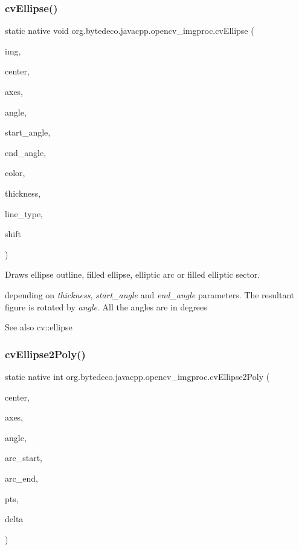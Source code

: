 \subsubsection{\texorpdfstring{cv\+Ellipse()}{cvEllipse()}}
{\footnotesize\ttfamily static native void org.\+bytedeco.\+javacpp.\+opencv\+\_\+imgproc.\+cv\+Ellipse (\begin{DoxyParamCaption}\item[{Cv\+Arr}]{img,  }\item[{@By\+Val Cv\+Point}]{center,  }\item[{@By\+Val Cv\+Size}]{axes,  }\item[{double}]{angle,  }\item[{double}]{start\+\_\+angle,  }\item[{double}]{end\+\_\+angle,  }\item[{@By\+Val Cv\+Scalar}]{color,  }\item[{int}]{thickness,  }\item[{int}]{line\+\_\+type,  }\item[{int}]{shift }\end{DoxyParamCaption})\hspace{0.3cm}{\ttfamily [static]}}



Draws ellipse outline, filled ellipse, elliptic arc or filled elliptic sector. 

depending on {\itshape thickness}, {\itshape start\+\_\+angle} and {\itshape end\+\_\+angle} parameters. The resultant figure is rotated by {\itshape angle}. All the angles are in degrees \begin{DoxySeeAlso}{See also}
cv\+::ellipse 
\end{DoxySeeAlso}
\mbox{\label{group__imgproc__c_ga4636892155a3d693c0906197d7777d0c}} 
\subsubsection{\texorpdfstring{cv\+Ellipse2\+Poly()}{cvEllipse2Poly()}}
{\footnotesize\ttfamily static native int org.\+bytedeco.\+javacpp.\+opencv\+\_\+imgproc.\+cv\+Ellipse2\+Poly (\begin{DoxyParamCaption}\item[{@By\+Val Cv\+Point}]{center,  }\item[{@By\+Val Cv\+Size}]{axes,  }\item[{int}]{angle,  }\item[{int}]{arc\+\_\+start,  }\item[{int}]{arc\+\_\+end,  }\item[{Cv\+Point}]{pts,  }\item[{int}]{delta }\end{DoxyParamCaption})\hspace{0.3cm}{\ttfamily [static]}}




